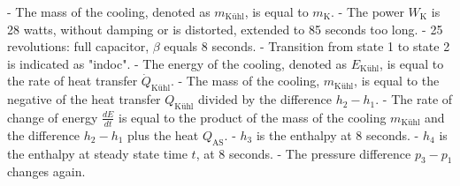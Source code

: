 - The mass of the cooling, denoted as \( m_{\text{Kühl}} \), is equal to \( m_{\text{K}} \).
- The power \( W_{\text{K}} \) is 28 watts, without damping or is distorted, extended to 85 seconds too long.
- 25 revolutions: full capacitor, \( \beta \) equals 8 seconds.
- Transition from state 1 to state 2 is indicated as "indoc".
- The energy of the cooling, denoted as \( E_{\text{Kühl}} \), is equal to the rate of heat transfer \( \dot{Q}_{\text{Kühl}} \).
- The mass of the cooling, \( m_{\text{Kühl}} \), is equal to the negative of the heat transfer \( Q_{\text{Kühl}} \) divided by the difference \( h_2 - h_1 \).
- The rate of change of energy \( \frac{dE}{dt} \) is equal to the product of the mass of the cooling \( m_{\text{Kühl}} \) and the difference \( h_2 - h_1 \) plus the heat \( Q_{\text{AS}} \).
- \( h_3 \) is the enthalpy at 8 seconds.
- \( h_4 \) is the enthalpy at steady state time \( t \), at 8 seconds.
- The pressure difference \( p_3 - p_1 \) changes again.